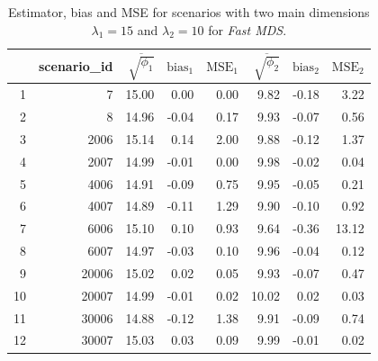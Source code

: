 \documentclass[11pt]{report}
\begin{document}
\begin{table}[ht]
\centering
\begin{tabular}{rrrrrrrr}
 & scenario\_id & $\overline{\sqrt{\phi_1}}$ & $\mbox{bias}_1$ & $\mbox{MSE}_1$ & $\overline{\sqrt{\phi_2}}$ & $\mbox{bias}_2$ & $\mbox{MSE}_2$ \\  
  \hline
  1 & 7 & 15.00 & 0.00 & 0.00 & 9.82 & -0.18 & 3.22 \\ 
  2 & 8 & 14.96 & -0.04 & 0.17 & 9.93 & -0.07 & 0.56 \\ 
  3 & 2006 & 15.14 & 0.14 & 2.00 & 9.88 & -0.12 & 1.37 \\ 
  4 & 2007 & 14.99 & -0.01 & 0.00 & 9.98 & -0.02 & 0.04 \\ 
  5 & 4006 & 14.91 & -0.09 & 0.75 & 9.95 & -0.05 & 0.21 \\ 
  6 & 4007 & 14.89 & -0.11 & 1.29 & 9.90 & -0.10 & 0.92 \\ 
  7 & 6006 & 15.10 & 0.10 & 0.93 & 9.64 & -0.36 & 13.12 \\ 
  8 & 6007 & 14.97 & -0.03 & 0.10 & 9.96 & -0.04 & 0.12 \\ 
  9 & 20006 & 15.02 & 0.02 & 0.05 & 9.93 & -0.07 & 0.47 \\ 
  10 & 20007 & 14.99 & -0.01 & 0.02 & 10.02 & 0.02 & 0.03 \\ 
  11 & 30006 & 14.88 & -0.12 & 1.38 & 9.91 & -0.09 & 0.74 \\ 
  12 & 30007 & 15.03 & 0.03 & 0.09 & 9.99 & -0.01 & 0.02 \\ 
   \hline
\end{tabular}
\caption{Estimator, bias and MSE for scenarios with two main dimensions $\lambda_1 = 15$ and $\lambda_2 = 10$ for \textit{Fast MDS}.}
\end{table}
\end{document}
